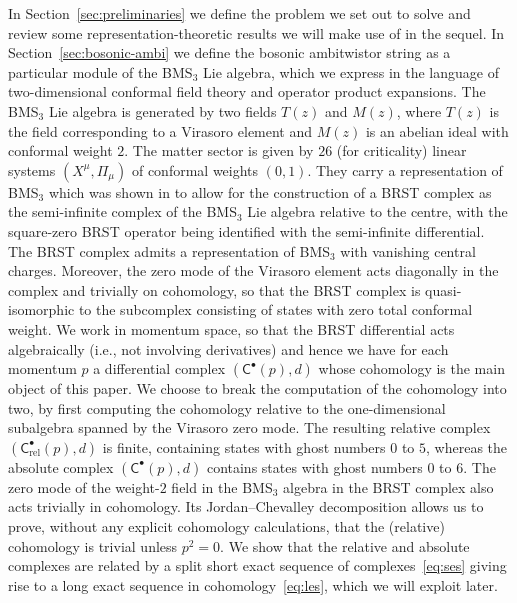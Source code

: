 \documentclass[11pt,reqno,a4paper,final]{amsart}
\theoremstyle{plain}
\theoremstyle{definition}
\newcommand{\sC}{\mathsf{C}}
\newcommand{\Crel}{\mathsf{C}_{\mathrm{rel}}} %
\newcommand{\1}{\mathbb{1}}
\numberwithin{equation}{section}
\begin{document}
In Section~\ref{sec:preliminaries} we define the problem we set out to
solve and review some representation-theoretic results we will make
use of in the sequel.  In Section~\ref{sec:bosonic-ambi} we define the
bosonic ambitwistor string as a particular module of the BMS$_3$ Lie
algebra, which we express in the language of two-dimensional conformal
field theory and operator product expansions.  The BMS$_3$ Lie algebra
is generated by two fields $T(z)$ and $M(z)$, where $T(z)$ is the
field corresponding to a Virasoro element and $M(z)$ is an abelian
ideal with conformal weight $2$.  The matter sector is given by $26$
(for criticality) linear systems $(X^\mu, \Pi_\mu)$ of conformal
weights $(0,1)$.  They carry a representation of BMS$_3$ which was
shown in \cite{Figueroa-OFarrill:2024wgs} to allow for the
construction of a BRST complex as the semi-infinite complex of the
BMS$_3$ Lie algebra relative to the centre, with the square-zero BRST
operator being identified with the semi-infinite differential.  The
BRST complex admits a representation of BMS$_3$ with vanishing
central charges.  Moreover, the zero mode of the Virasoro element acts
diagonally in the complex and trivially on cohomology, so that the
BRST complex is quasi-isomorphic to the subcomplex consisting of
states with zero total conformal weight.  We work in momentum space,
so that the BRST differential acts algebraically (i.e., not involving
derivatives) and hence we have for each momentum $p$ a differential
complex $\left(\sC^\bullet(p), d\right)$ whose cohomology is the main
object of this paper.  We choose to break the computation of the
cohomology into two, by first computing the cohomology relative to the
one-dimensional subalgebra spanned by the Virasoro zero mode. The
resulting relative complex $\left(\Crel^\bullet(p),d\right)$ is
finite, containing states with ghost numbers $0$ to $5$, whereas the
absolute complex $\left( \sC^\bullet(p), d \right)$ contains states
with ghost numbers $0$ to $6$.  The zero mode of the weight-$2$ field
in the BMS$_3$ algebra in the BRST complex also acts trivially in
cohomology.  Its Jordan--Chevalley decomposition allows us to prove, 
without any explicit cohomology calculations, 
that the (relative) cohomology is trivial unless $p^2=0$. We show that
the relative and absolute complexes are related by a split short exact
sequence of complexes~\eqref{eq:ses} giving rise to a long exact
sequence in cohomology~\eqref{eq:les}, which we will exploit later.
\end{document}
